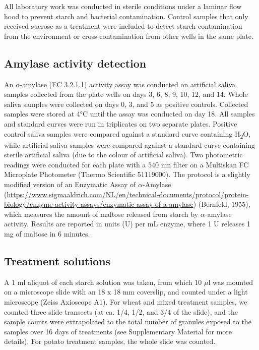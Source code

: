 \documentclass[
]{article}
\begin{document}
All laboratory work was conducted in sterile conditions under a laminar flow hood
to prevent starch and bacterial contamination. Control samples that only received
sucrose as a treatment were included to detect starch contamination from the
environment or cross-contamination from other wells in the same plate.

\hypertarget{amylase-activity-detection}{%
\subsection{Amylase activity detection}\label{amylase-activity-detection}}

An \(\alpha\)-amylase (EC 3.2.1.1) activity assay was conducted on artificial
saliva samples collected from the plate wells on days 3, 6, 8, 9, 10, 12, and 14.
Whole saliva samples were collected on days 0, 3, and 5 as positive controls.
Collected samples were stored at 4°C until the assay was conducted on day 18.
All samples and standard curves were run in triplicates on two separate plates.
Positive control saliva samples were compared against a standard curve containing
H\textsubscript{2}O, while artificial saliva samples were compared against a standard curve
containing sterile artificial saliva (due to the colour of artificial saliva).
Two photometric readings were conducted for each plate with a 540 nm filter on a
Multiskan FC Microplate Photometer (Thermo Scientific 51119000).
The protocol is a slightly modified version of an Enzymatic Assay of \(\alpha\)-Amylase
(\url{https://www.sigmaaldrich.com/NL/en/technical-documents/protocol/protein-biology/enzyme-activity-assays/enzymatic-assay-of-a-amylase}) (Bernfeld, 1955), which measures the amount of
maltose released from starch by \(\alpha\)-amylase activity. Results are reported
in units (U) per mL enzyme, where 1 U releases 1 mg of maltose in 6 minutes.

\hypertarget{treatment-solutions}{%
\subsection{Treatment solutions}\label{treatment-solutions}}

A 1 ml aliquot of each starch solution was taken, from which 10 \(\mu\)l was mounted
on a microscope slide with an 18 x 18 mm coverslip, and counted under a light microscope
(Zeiss Axioscope A1). For wheat and mixed treatment samples, we counted three
slide transects (at ca. 1/4, 1/2, and 3/4 of the slide), and the sample counts
were extrapolated to the total number of granules exposed to the samples over 16
days of treatments (see Supplementary Material for more details). For potato
treatment samples, the whole slide was counted.
\end{document}
